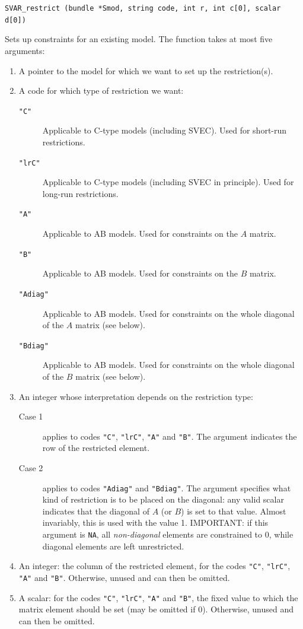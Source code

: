 \documentclass[a4paper,10pt]{article}
\newenvironment{funcdoc}[1]
{\noindent\hrulefill\newline\nopagebreak\texttt{#1}%
\nopagebreak\par\noindent\hrulefill%
\nopagebreak\par\nopagebreak\smallskip\nopagebreak\par}
{\bigskip}
\newcounter{script}[section]
\begin{document}
\begin{funcdoc}{SVAR\_restrict (bundle *Smod, string code, int r, int c[0], scalar d[0])}
\noindent Sets up constraints for an existing model. The function takes at
most five arguments:
\begin{enumerate}
\item A pointer to the model for which we want to set up the
  restriction(s).
\item A code for which type of restriction we want: 
  \begin{description}
  \item[\texttt{"C"}] Applicable to C-type models (including SVEC). Used for short-run
    restrictions.
  \item[\texttt{"lrC"}] Applicable to C-type models (including SVEC in principle). 
    Used for long-run restrictions.
  \item[\texttt{"A"}] Applicable to AB models. Used for constraints on
    the $A$ matrix.
  \item[\texttt{"B"}] Applicable to AB models. Used for constraints on
    the $B$ matrix.
  \item[\texttt{"Adiag"}] Applicable to AB models. Used for constraints on
    the whole diagonal of the $A$ matrix (see below).
  \item[\texttt{"Bdiag"}] Applicable to AB models. Used for constraints on
    the whole diagonal of the $B$ matrix (see below).
  \end{description}
\item An integer whose interpretation depends on the restriction type:
  \begin{description}
  \item[Case 1] applies to codes \texttt{"C"}, \texttt{"lrC"},
    \texttt{"A"} and \texttt{"B"}. The argument indicates the row of
    the restricted element.
  \item[Case 2] applies to codes \texttt{"Adiag"} and
    \texttt{"Bdiag"}. The argument specifies what kind of restriction
    is to be placed on the diagonal: any valid scalar indicates that
    the diagonal of $A$ (or $B$) is set to that value. Almost
    invariably, this is used with the value 1. IMPORTANT: if this
    argument is \texttt{NA}, all \emph{non-diagonal} elements are
    constrained to 0, while diagonal elements are left unrestricted.
  \end{description}
\item An integer: the column of the restricted element, for the codes
  \texttt{"C"}, \texttt{"lrC"}, \texttt{"A"} and
  \texttt{"B"}. Otherwise, unused and can then be omitted.
\item A scalar: for the codes \texttt{"C"}, \texttt{"lrC"},
  \texttt{"A"} and \texttt{"B"}, the fixed value to which the matrix
  element should be set (may be omitted if 0). Otherwise, unused and
  can then be omitted.
\end{enumerate}


\end{funcdoc}
\end{document}
